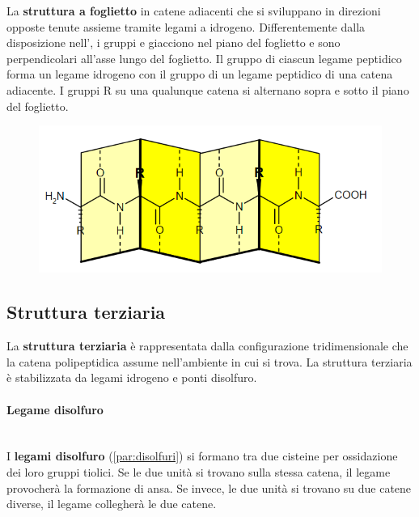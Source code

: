 \begin{minipage}{.55\textwidth}
	La \textbf{struttura a foglietto } in catene adiacenti che si sviluppano in direzioni opposte tenute assieme tramite legami a idrogeno. Differentemente dalla disposizione nell’, i gruppi  e  giacciono nel piano del foglietto e sono perpendicolari all’asse lungo del foglietto. Il gruppo  di ciascun legame peptidico forma un legame idrogeno con il gruppo  di un legame peptidico di una catena adiacente. I gruppi R su una qualunque catena si alternano sopra e sotto il piano del foglietto.
\end{minipage}
\begin{minipage}{.4\textwidth}
	\begin{figure}[H]
		\centering
		\vspace{-10pt}
		\includegraphics[scale=0.5]{immagini/Code_IL8tmGoF4t.png}
	\end{figure}
\end{minipage}

\subsection{Struttura terziaria}
La \textbf{struttura terziaria} è rappresentata dalla configurazione tridimensionale che la catena polipeptidica assume nell'ambiente in cui si trova. La struttura terziaria è stabilizzata da legami idrogeno e ponti disolfuro.


\paragraph{Legame disolfuro}\mbox{}\\
I \textbf{legami disolfuro} (\autoref{par:disolfuri}) si formano tra due cisteine per ossidazione dei loro gruppi tiolici. Se le due unità si trovano sulla stessa catena, il legame provocherà la formazione di ansa. Se invece, le due unità si trovano su due catene diverse, il legame collegherà le due catene.

